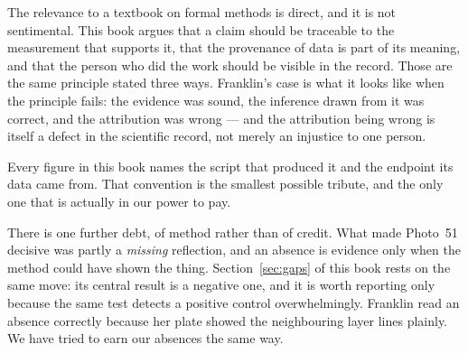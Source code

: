 \medskip\noindent
The relevance to a textbook on formal methods is direct, and it is not
sentimental. This book argues that a claim should be traceable to the measurement
that supports it, that the provenance of data is part of its meaning, and that
the person who did the work should be visible in the record. Those are the same
principle stated three ways. Franklin's case is what it looks like when the
principle fails: the evidence was sound, the inference drawn from it was correct,
and the attribution was wrong --- and the attribution being wrong is itself a
defect in the scientific record, not merely an injustice to one person.

\medskip\noindent
Every figure in this book names the script that produced it and the endpoint its
data came from. That convention is the smallest possible tribute, and the only
one that is actually in our power to pay.

\medskip\noindent
There is one further debt, of method rather than of credit. What made Photo~51
decisive was partly a \emph{missing} reflection, and an absence is evidence only
when the method could have shown the thing. Section~\ref{sec:gaps} of this book
rests on the same move: its central result is a negative one, and it is worth
reporting only because the same test detects a positive control
overwhelmingly. Franklin read an absence correctly because her plate showed the
neighbouring layer lines plainly. We have tried to earn our absences the same
way.

\vspace*{\fill}
\clearpage
